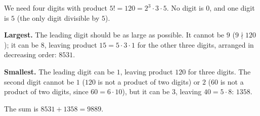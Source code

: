 We need four digits with product $5!=120=2^3\cdot3\cdot5$. No digit is $0$, and one digit is $5$ (the only digit divisible by $5$).

\textbf{Largest.} The leading digit should be as large as possible. It cannot be $9$ ($9\nmid120$); it can be $8$, leaving product $15=5\cdot3\cdot1$ for the other three digits, arranged in decreasing order: $8531$.

\textbf{Smallest.} The leading digit can be $1$, leaving product $120$ for three digits. The second digit cannot be $1$ ($120$ is not a product of two digits) or $2$ ($60$ is not a product of two digits, since $60=6\cdot10$), but it can be $3$, leaving $40=5\cdot8$: $1358$.

The sum is $8531+1358=\boxed{9889}$.
